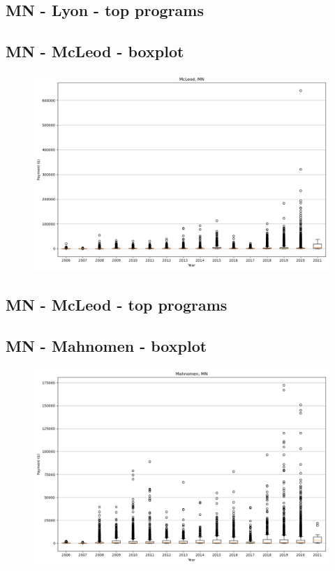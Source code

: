 \subsection*{MN - Lyon - top programs}

\newpage
\subsection*{MN - McLeod - boxplot}
\begin{figure}[h]
\centering
\includegraphics[width=7in]{../output/boxplots/counties/McLeod-MN_boxplot.png}
\end{figure}


\subsection*{MN - McLeod - top programs}

\newpage
\subsection*{MN - Mahnomen - boxplot}
\begin{figure}[h]
\centering
\includegraphics[width=7in]{../output/boxplots/counties/Mahnomen-MN_boxplot.png}
\end{figure}


